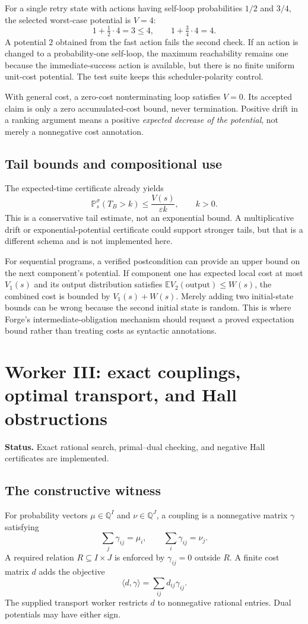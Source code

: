 \documentclass[11pt,letterpaper]{article}
\theoremstyle{definition}\newtheorem{definition}[theorem]{Definition}
\theoremstyle{remark}\newtheorem{remark}[theorem]{Remark}
\newcommand{\Q}{\mathbb Q}\newcommand{\R}{\mathbb R}\newcommand{\N}{\mathbb N}
\newcommand{\E}{\mathbb E}\newcommand{\Prob}{\mathbb P}
\newcommand{\status}[1]{\par\noindent\textbf{Status.} #1\par}
\begin{document}
For a single retry state with actions having self-loop probabilities $1/2$ and $3/4$, the selected worst-case potential is $V=4$:
\[
 1+\tfrac12\cdot4=3\le4,
 \qquad 1+\tfrac34\cdot4=4.
\]
A potential $2$ obtained from the fast action fails the second check. If an action is changed to a probability-one self-loop, the maximum reachability remains one because the immediate-success action is available, but there is no finite uniform unit-cost potential. The test suite keeps this scheduler-polarity control.

With general cost, a zero-cost nonterminating loop satisfies $V=0$. Its accepted claim is only a zero accumulated-cost bound, never termination. Positive drift in a ranking argument means a positive \emph{expected decrease of the potential}, not merely a nonnegative cost annotation.

\subsection{Tail bounds and compositional use}
The expected-time certificate already yields
\[
 \Prob_s^\sigma(T_B>k)\le\frac{V(s)}{\varepsilon k},\qquad k>0.
\]
This is a conservative tail estimate, not an exponential bound. A multiplicative drift or exponential-potential certificate could support stronger tails, but that is a different schema and is not implemented here.

For sequential programs, a verified postcondition can provide an upper bound on the next component's potential. If component one has expected local cost at most $V_1(s)$ and its output distribution satisfies $\E V_2(\text{output})\le W(s)$, the combined cost is bounded by $V_1(s)+W(s)$. Merely adding two initial-state bounds can be wrong because the second initial state is random. This is where Forge's intermediate-obligation mechanism should request a proved expectation bound rather than treating costs as syntactic annotations.

\section{Worker III: exact couplings, optimal transport, and Hall obstructions}
\status{Exact rational search, primal--dual checking, and negative Hall certificates are implemented.}
\subsection{The constructive witness}
For probability vectors $\mu\in\Q^I$ and $\nu\in\Q^J$, a coupling is a nonnegative matrix $\gamma$ satisfying
\begin{equation}\label{eq:marginals}
 \sum_j\gamma_{ij}=\mu_i,\qquad
 \sum_i\gamma_{ij}=\nu_j.
\end{equation}
A required relation $R\subseteq I\times J$ is enforced by $\gamma_{ij}=0$ outside $R$. A finite cost matrix $d$ adds the objective
\[
 \langle d,\gamma\rangle=\sum_{ij}d_{ij}\gamma_{ij}.
\]
The supplied transport worker restricts $d$ to nonnegative rational entries. Dual potentials may have either sign.
\end{document}
